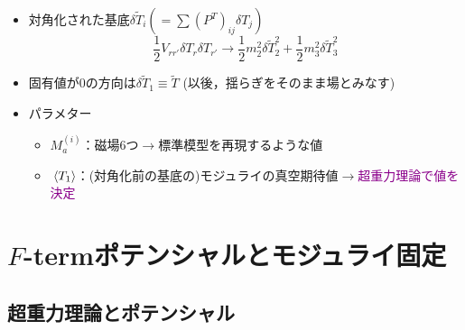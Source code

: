 \documentclass[
  a4paper,uplatex,dvipdfmx,9pt,
  xcolor = {dvipsnames,svgnames},
  hyperref ={colorlinks=true,citecolor=Navy,linkcolor=NavyBlue,urlcolor=purple}
]{beamer}
\begin{document}
\begin{frame}
  \begin{itemize}
    \item 
    対角化された基底$\delta \tilde{T}_{i}(=\sum(P^{T})_{ij}\delta T_{j})$
    \begin{equation}
      \frac{1}{2}
      V_{rr'}
      \delta T_{r}\delta T_{r'}
      \rightarrow
      \frac{1}{2}m_{2}^2 \delta \tilde{T}_{2}^2
      +
      \frac{1}{2}m_{3}^2 \delta \tilde{T}_{3}^2
      \nonumber
    \end{equation}
    \item 
    固有値が0の方向は$\delta \tilde{T}_{1}\equiv\tilde{T}$
    (以後，揺らぎをそのまま場とみなす)
    \item 
    パラメター
    \begin{itemize}
      \item 
      $M_{a}^{(i)}$：磁場6つ$\rightarrow$標準模型を再現するような値
      \item 
      $\ev*{T_{1}}$：(対角化前の基底の)モジュライの真空期待値$\rightarrow$\textcolor{DarkMagenta}{超重力理論で値を決定}
    \end{itemize}
  \end{itemize}

\end{frame}


\section{\texorpdfstring{$F$}{F}-termポテンシャルとモジュライ固定}

\subsection{超重力理論とポテンシャル}
\end{document}
